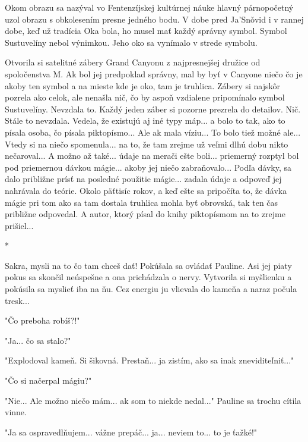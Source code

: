 \documentclass{book}
\begin{document}
Okom obrazu sa nazýval vo Fentenzíjskej kultúrnej náuke hlavný párnopočetný uzol obrazu s obkolesením presne jedného bodu. V dobe pred Ja'Sno\v{}vid i v rannej dobe, keď už tradícia Oka bola, ho musel mať každý správny symbol. Symbol Sustuvelíny nebol výnimkou. Jeho oko sa vynímalo v strede symbolu.

Otvorila si satelitné zábery Grand Canyonu z najpresnejšej družice od spoločenstva M. Ak bol jej predpoklad správny, mal by byť v Canyone niečo čo je akoby ten symbol a na mieste kde je oko, tam je truhlica. Zábery si najskôr pozrela ako celok, ale nenašla nič, čo by aspoň vzdialene pripomínalo symbol Sustuvelíny. Nevzdala to. Každý jeden záber si pozorne prezrela do detailov. Nič. Stále to nevzdala. Vedela, že existujú aj iné typy máp... a bolo to tak, ako to písala osoba, čo písala piktopísmo... Ale ak mala víziu... To bolo tiež možné ale... Vtedy si na niečo spomenula... na to, že tam zrejme už veľmi dlhú dobu nikto nečaroval... A možno až také... údaje na merači ešte boli... priemerný rozptyl bol pod priemernou dávkou mágie... akoby jej niečo zabraňovalo... Podľa dávky, sa dalo približne prísť na posledné použitie mágie... zadala údaje a odpoveď jej nahrávala do teórie. Okolo päťtisíc rokov, a keď ešte sa pripočíta to, že dávka mágie pri tom ako sa tam dostala truhlica mohla byť obrovská, tak ten čas približne odpovedal. A autor, ktorý písal do knihy piktopísmom na to zrejme prišiel...

\begin{center}

*

\end{center}

Sakra, mysli na to čo tam chceš dať! Pokúšala sa ovládať Pauline. Asi jej piaty pokus sa skončil neúspešne a ona prichádzala o nervy. Vytvorila si myšlienku a pokúsila sa myslieť iba na ňu. Cez energiu ju vlievala do kameňa a naraz počula tresk...

"$ $Čo preboha robíš?!"$ $ 

"$ $Ja... čo sa stalo?"$ $ 

"$ $Explodoval kameň. Si šikovná. Prestaň... ja zistím, ako sa inak zneviditeľniť..."$ $ 

"$ $Čo si načerpal mágiu?"$ $ 

"$ $Nie... Ale možno niečo mám... ak som to niekde nedal..."$ $  Pauline sa trochu cítila vinne.

"$ $Ja sa ospravedlňujem... vážne prepáč... ja... neviem to... to je ťažké!"$ $ 
\end{document}
